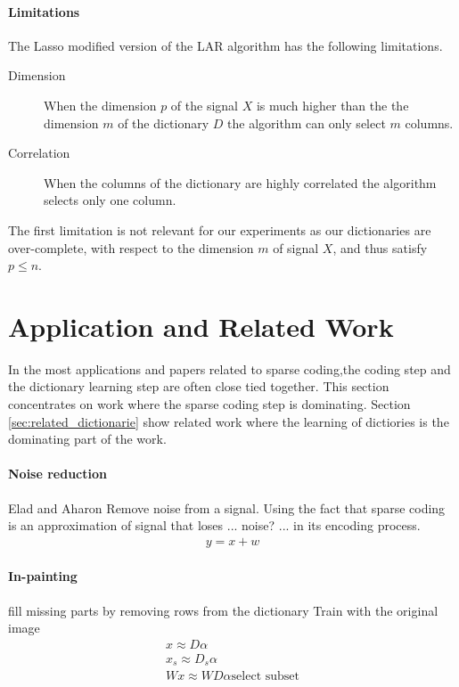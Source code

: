 \paragraph{Limitations}
The Lasso modified version of the LAR algorithm has the following limitations.
\begin{description}
 \item[Dimension] When the dimension $p$ of the signal $X$ is much higher than
the the dimension $m$ of the dictionary $D$ the algorithm can only select $m$
columns.
  \item[Correlation] When the columns of the dictionary are highly correlated
the algorithm selects only one column.
\end{description}
The first limitation is not relevant for our experiments as our dictionaries
are over-complete, with respect to the dimension $m$ of signal $X$, and thus
satisfy $p\leq n$. 

\section{Application and Related Work}
In the most applications and papers related to sparse coding,the coding
step and the dictionary learning step are often close tied together. This
section concentrates on work where the sparse coding step is dominating. Section
\ref{sec:related_dictionarie} show related work where the learning of dictiories
is the dominating part of the work.

\paragraph{Noise reduction}
Elad and Aharon\cite{Elad2006}
Remove noise from a signal. 
Using the fact that sparse coding is an approximation of signal that loses ...
noise? ... in its encoding process. 
\begin{align*}
y = x + w
\end{align*}

\paragraph{In-painting}
fill missing parts by removing rows from the dictionary
Train with the original image
\begin{align*}
x \approx D\alpha\\
x_s \approx D_s\alpha\\
Wx \approx WD\alpha\text{select subset}\\
\end{align*}
\cite{mairal08sparse}



